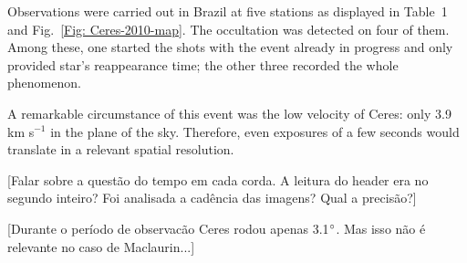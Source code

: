 \documentclass[useAMS,usenatbib]{mn2e}
\begin{document}
Observations were carried out in Brazil at five stations as displayed in Table~1 and Fig.~\ref{Fig: Ceres-2010-map}. The occultation was detected on four of them. Among these, one started the shots with the event already in progress and only provided star's reappearance time; the other three recorded the whole phenomenon.

A remarkable circumstance of this event was the low velocity of Ceres: only 3.9 km s$^{-1}$ in the plane of the sky. Therefore, even exposures of a few seconds would translate in a relevant spatial resolution.


[Falar sobre a quest\~ao do tempo em cada corda. A leitura do header era no segundo inteiro? Foi analisada a cad\^encia das imagens? Qual a precis\~ao?]

[Durante o per\'iodo de observac\~ao Ceres rodou apenas 3.1$\hbox{$^\circ$}$. Mas isso n\~ao \'e relevante no caso de Maclaurin...]
\end{document}

